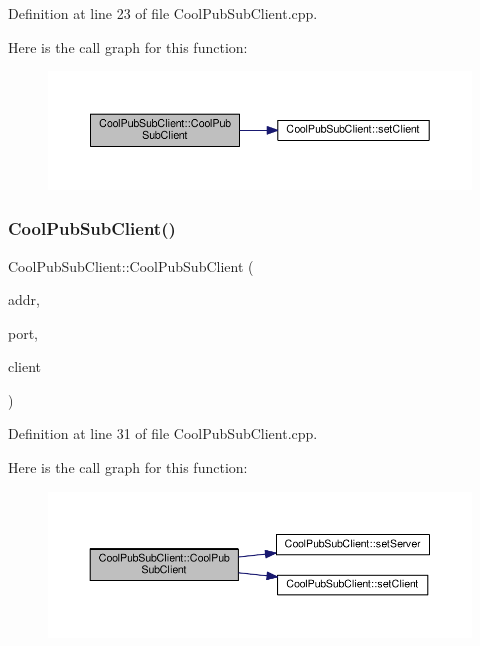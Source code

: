 Definition at line 23 of file Cool\+Pub\+Sub\+Client.\+cpp.

Here is the call graph for this function\+:\nopagebreak
\begin{figure}[H]
\begin{center}
\leavevmode
\includegraphics[width=350pt]{class_cool_pub_sub_client_a0563a12cb4e9339bf2605cfc655e717d_cgraph}
\end{center}
\end{figure}
\mbox{\label{class_cool_pub_sub_client_a4548ad6f306f6181e337a86c0b21a89a}} 
\subsubsection{\texorpdfstring{Cool\+Pub\+Sub\+Client()}{CoolPubSubClient()}\hspace{0.1cm}{\footnotesize\ttfamily [3/14]}}
{\footnotesize\ttfamily Cool\+Pub\+Sub\+Client\+::\+Cool\+Pub\+Sub\+Client (\begin{DoxyParamCaption}\item[{I\+P\+Address}]{addr,  }\item[{uint16\+\_\+t}]{port,  }\item[{Client \&}]{client }\end{DoxyParamCaption})}



Definition at line 31 of file Cool\+Pub\+Sub\+Client.\+cpp.

Here is the call graph for this function\+:\nopagebreak
\begin{figure}[H]
\begin{center}
\leavevmode
\includegraphics[width=350pt]{class_cool_pub_sub_client_a4548ad6f306f6181e337a86c0b21a89a_cgraph}
\end{center}
\end{figure}
\mbox{\label{class_cool_pub_sub_client_af8b1aeb169366da52e3289bb6c238b6b}} 
